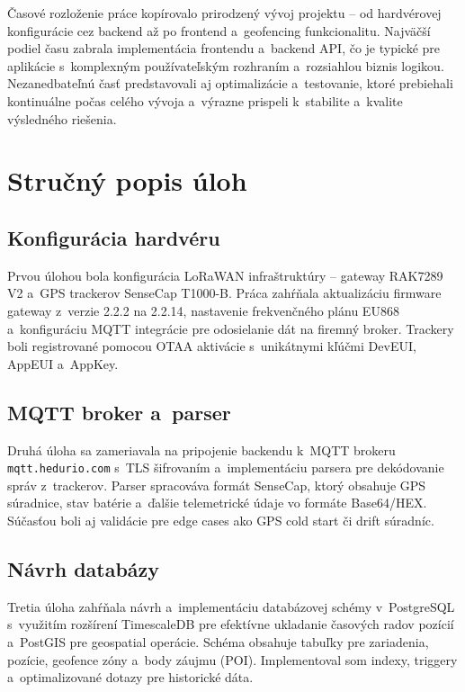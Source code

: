 Časové rozloženie práce kopírovalo prirodzený vývoj projektu -- od hardvérovej konfigurácie cez backend až po frontend a~geofencing funkcionalitu. Najväčší podiel času zabrala implementácia frontendu a~backend API, čo je typické pre aplikácie s~komplexným používateľským rozhraním a~rozsiahlou biznis logikou. Nezanedbateľnú časť predstavovali aj optimalizácie a~testovanie, ktoré prebiehali kontinuálne počas celého vývoja a~výrazne prispeli k~stabilite a~kvalite výsledného riešenia.


\section{Stručný popis úloh}
\label{sec:PopisUkolu}

\subsection{Konfigurácia hardvéru}
\label{sec:UlohaHW}

Prvou úlohou bola konfigurácia LoRaWAN infraštruktúry -- gateway RAK7289 V2 a~GPS trackerov SenseCap T1000-B. Práca zahŕňala aktualizáciu firmware gateway z~verzie 2.2.2 na 2.2.14, nastavenie frekvenčného plánu EU868 a~konfiguráciu MQTT integrácie pre odosielanie dát na firemný broker. Trackery boli registrované pomocou OTAA aktivácie s~unikátnymi kľúčmi DevEUI, AppEUI a~AppKey.

\subsection{MQTT broker a~parser}
\label{sec:UlohaMQTT}

Druhá úloha sa zameriavala na pripojenie backendu k~MQTT brokeru \texttt{mqtt.hedurio.com} s~TLS šifrovaním a~implementáciu parsera pre dekódovanie správ z~trackerov. Parser spracováva formát SenseCap, ktorý obsahuje GPS súradnice, stav batérie a~ďalšie telemetrické údaje vo formáte Base64/HEX. Súčasťou boli aj validácie pre edge cases ako GPS cold start či drift súradníc.

\subsection{Návrh databázy}
\label{sec:UlohaDB}

Tretia úloha zahŕňala návrh a~implementáciu databázovej schémy v~PostgreSQL s~využitím rozšírení TimescaleDB pre efektívne ukladanie časových radov pozícií a~PostGIS pre geospatial operácie. Schéma obsahuje tabuľky pre zariadenia, pozície, geofence zóny a~body záujmu (POI). Implementoval som indexy, triggery a~optimalizované dotazy pre historické dáta.

